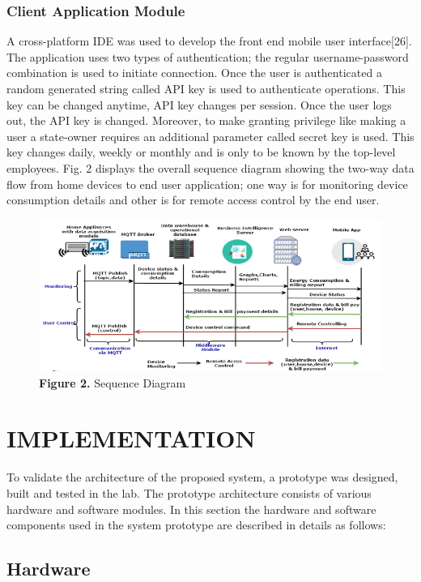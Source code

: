 \documentclass[a4paper,12pt,oneside]{article}
\let\counterwithin\relax
\begin{document}
\subsubsection{Client Application Module}
A cross-platform IDE was used to develop the front end
mobile user interface[26]. The application uses two types of
authentication; the regular username-password combination is
used to initiate connection. Once the user is authenticated a
random generated string called API key is used to authenticate
operations. This key can be changed anytime, API key
changes per session. Once the user logs out, the API key is
changed. Moreover, to make granting privilege like making a
user a state-owner requires an additional parameter called
secret key is used. This key changes daily, weekly or monthly
and is only to be known by the top-level employees. Fig. 2
displays the overall sequence diagram showing the two-way
data flow from home devices to end user application; one way
is for monitoring device consumption details and other is for
remote access control by the end user.
\begin{figure}[H]
\includegraphics{figure2.png}
\centering
\caption{\textbf{Figure 2.} Sequence Diagram}
\end{figure}

\newpage
\section{IMPLEMENTATION}
To validate the architecture of the proposed system, a
prototype was designed, built and tested in the lab. The
prototype architecture consists of various hardware and
software modules. In this section the hardware and software
components used in the system prototype are described in
details as follows:
\subsection{Hardware}
\end{document}
